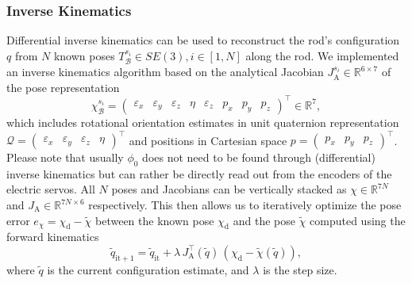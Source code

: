\subsubsection{Inverse Kinematics}\label{ssub:hsamodel:hsa_rod_kinematics:inverse_kinematics}
Differential inverse kinematics can be used to reconstruct the rod's configuration $q$ from $N$ known poses $T_{\mathcal{B}}^{s_i} \in SE(3), i \in [1, N]$ along the rod. 
We implemented an inverse kinematics algorithm based on the analytical Jacobian $J_\mathrm{A}^{s_i} \in \mathbb{R}^{6 \times 7}$ of the pose representation
\begin{equation*}
    \chi_{\mathcal{B}}^{s_i} = \begin{pmatrix}
        \varepsilon_x & \varepsilon_y & \varepsilon_z & \eta & \varepsilon_z & p_x & p_y & p_z
    \end{pmatrix}^\top \in \mathbb{R}^{7},
\end{equation*}
which includes rotational orientation estimates in unit quaternion representation $\mathcal{Q} = \begin{pmatrix} \varepsilon_x & \varepsilon_y & \varepsilon_z & \eta \end{pmatrix}^\top$ and positions in Cartesian space $p = \begin{pmatrix} p_x & p_y & p_z \end{pmatrix}^\top$.
Please note that usually $\phi_0$ does not need to be found through (differential) inverse kinematics but can rather be directly read out from the encoders of the electric servos.
All $N$ poses and Jacobians can be vertically stacked as $\chi \in \mathbb{R}^{7N}$  and $J_\mathrm{A} \in \mathbb{R}^{7N \times 6}$  respectively. This then allows us to iteratively optimize the pose error $e_\chi = \chi_\mathrm{d} - \tilde{\chi}$ between the known pose $\chi_\mathrm{d}$ and the pose $\tilde{\chi}$ computed using the forward kinematics
\begin{equation}
    \tilde{q}_{\mathrm{it} + 1} = \tilde{q}_{\mathrm{it}} + \lambda \, J_\mathrm{A}^\top(\tilde{q}) \, \left ( \chi_\mathrm{d} - \tilde{\chi}(\tilde{q}) \right ),
\end{equation}
where $\tilde{q}$ is the current configuration estimate, and $\lambda$ is the step size.

